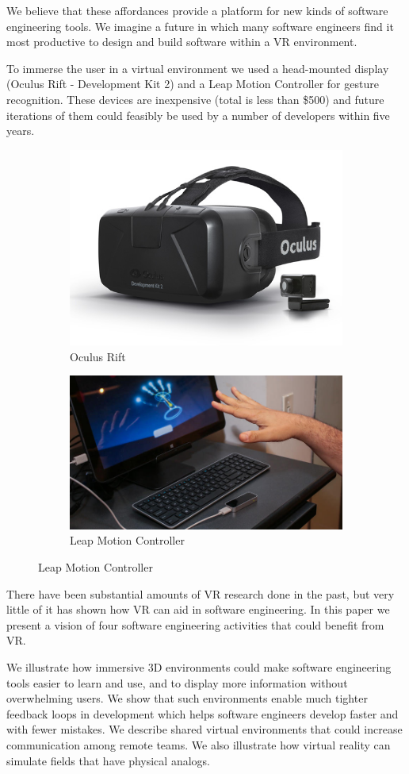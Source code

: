 \documentclass{acm_proc_article-sp}
\begin{document}
We believe that these affordances provide a platform for new kinds of software engineering tools. We imagine a future in which many software engineers find it most productive to design and build software within a VR environment. 

To immerse the user in a virtual environment we used a head-mounted display (Oculus Rift - Development Kit 2) and a Leap Motion Controller for gesture recognition. These devices are inexpensive (total is less than \$500) and future iterations of them could feasibly be used by a number of developers within five years.

\begin{figure}[ht!]
\centering
\begin{subfigure}{.5\columnwidth}
	\centering
	\includegraphics[width=.4\linewidth]{figures/dk2}
	\caption{Oculus Rift\label{fig:rift}}
\end{subfigure}%
\begin{subfigure}{.5\columnwidth}
  \centering
  \includegraphics[width=.4\linewidth]{figures/LeapAndKeyboard}
  \caption{Leap Motion Controller \label{fig:leap}}
\end{subfigure}
\end{figure}

There have been substantial amounts of VR research done in the past, but very little of it has shown how VR can aid in software engineering. In this paper we present a vision of four software engineering activities that could benefit from VR.

We illustrate how immersive 3D environments could make software engineering tools easier to learn and use, and to display more information without overwhelming users. We show that such environments enable much tighter feedback loops in development which helps software engineers develop faster and with fewer mistakes. We describe shared virtual environments that could increase communication among remote teams. We also illustrate how virtual reality can simulate fields that have physical analogs.
\end{document}
